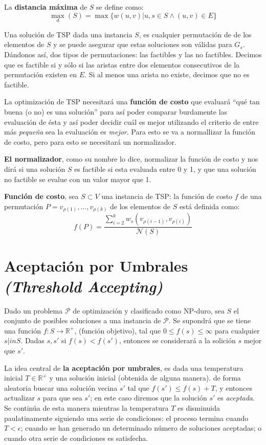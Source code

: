 \documentclass{article}
\begin{document}
La \textbf{distancia máxima} de $S$ se define como:
\[
    \max_d (S) = \max \{ w(u,v) | u,s \in S \land (u,v) \in E \} 
\]

Una solución de TSP dada una instancia $S$, es cualquier permutación de de los elementos de $S$ y se
puede asegurar que estas soluciones son válidas para $G_s$. Dándonos así, dos tipos de permutaciones:
las factibles y las no factibles. Decimos que es factible si y sólo si las aristas entre dos elementos
consecutivos de la permutación existen en $E$. Si al menos una arista no existe, decimos que no es
factible.


La optimización de TSP necesitará una \textbf{función de costo} que evaluará ``qué tan buena (o no) es una
solución'' para así poder comparar burdamente las evaluación de ésta y así poder decidir cuál es
mejor utilizando el criterio de entre más \textit{pequeña} sea la evaluación es \textit{mejor}.
Para esto se va a normallizar la función de costo, pero para esto se necesitará un normalizador.

\textbf{El normalizador}, como su nombre lo dice, normalizar la función de costo y nos dirá si una
solución $S$ es factible si esta evaluada entre 0 y 1, y que una solución no factible se evalue con
un valor mayor que 1.

\textbf{Función de costo}, sea $S \subset V$ una instancia de TSP: la función de costo $f$ de una
permutación $P = v_{\rho(1)}, \ldots, v_{\rho(k)}$ de los elementos de $S$ está definida como:
\[
    f(P) = \frac{\sum_{i=2}^{k} w_s(v_{\rho(i-1)}, v_{\rho(i)})}{\mathcal{N}(S)}
\]

\section{Aceptación por Umbrales \emph{(Threshold Accepting)}}
Dado un problema $\mathscr{P}$ de optimización y clasificado como NP-duro, sea $S$ el conjunto de
posibles soluciones a una instancia de $\mathscr{P}$. Se supondrá que se tiene una función
$f: S \to \mathds{R}^+$, (función objetivo), tal que $0 \leq f(s) \leq \infty$ para cualquier
$s |in S$. Dadas $s,s'$ si $f(s) < f(s')$, entonces se considerará a la solición $s$ mejor que $s'$.

La idea central de \textbf{la aceptación por umbrales}, es dada una temperatura inicial
$T \in \mathds{R}^+$ y una solución inicial (obtenida de alguna manera). de forma aleatoria buscar
una solución vecina $s'$ tal que $f(s') \leq f(s) + T$, y entonces actualizar $s$ para que sea $s'$;
en este caso diremos que la solución $s'$ es \emph{aceptada}. Se continúa de esta manera mientras la
temperatura $T$ es disminuida paulatinamente siguiendo una serie de condiciones: el proceso termina
cuando $T < \epsilon$; cuando se han generado un determinado número de soluciones aceptadas; o
cuando otra serie de condiciones es satisfecha.
\end{document}
